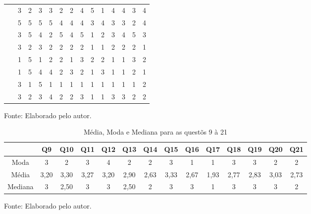 \documentclass[twoside,english,brazilian]{UNISINOSartigo}
\newcommand{\source}[1]{\caption*{Fonte: {#1}} }
\begin{document}
\begin{table}[h]
\begin{tabularx}{\columnwidth}{cccccccccccccc}
~ & 3 & 2 & 3 & 3 & 2 & 2 & 4 & 5 & 1 & 4 & 4 & 3 & 4 \\
~ & 5 & 5 & 5 & 5 & 4 & 4 & 4 & 3 & 4 & 3 & 3 & 2 & 4 \\
~ & 3 & 5 & 4 & 2 & 5 & 4 & 5 & 1 & 2 & 3 & 4 & 5 & 3 \\
~ & 3 & 2 & 3 & 2 & 2 & 2 & 2 & 1 & 1 & 2 & 2 & 2 & 1 \\
~ & 1 & 5 & 1 & 2 & 2 & 1 & 3 & 2 & 2 & 1 & 1 & 3 & 2 \\
~ & 1 & 5 & 4 & 4 & 2 & 3 & 2 & 1 & 3 & 1 & 1 & 2 & 1 \\
~ & 3 & 1 & 5 & 1 & 1 & 1 & 1 & 1 & 1 & 1 & 1 & 1 & 2 \\
~ & 3 & 2 & 3 & 4 & 2 & 2 & 3 & 1 & 1 & 3 & 3 & 2 & 2 \\ \hline
    \end{tabularx}
    \source{Elaborado pelo autor.}
\end{table}


\begin{table}[h]
\footnotesize
    \caption{Média, Moda e Mediana para as questõs 9 à 21}
    \begin{tabularx}{\columnwidth}{cccccccccccccc}
    \hline
    ~       & Q9   & Q10  & Q11  & Q12  & Q13  & Q14  & Q15  & Q16  & Q17  & Q18  & Q19  & Q20  & Q21  \\\hline
    Moda     & 3    & 2    & 3    & 4    & 2    & 2    & 3    & 1    & 1    & 3    & 3    & 2    & 2    \\
    Média   & 3,20 & 3,30 & 3,27 & 3,20 & 2,90 & 2,63 & 3,33 & 2,67 & 1,93 & 2,77 & 2,83 & 3,03 & 2,73 \\
    Mediana & 3    & 2,50 & 3    & 3    & 2,50 & 2    & 3    & 3    & 1    & 3    & 3    & 3    & 2    \\ \hline
    \end{tabularx}
    \source{Elaborado pelo autor.}
\end{table}
\end{document}
